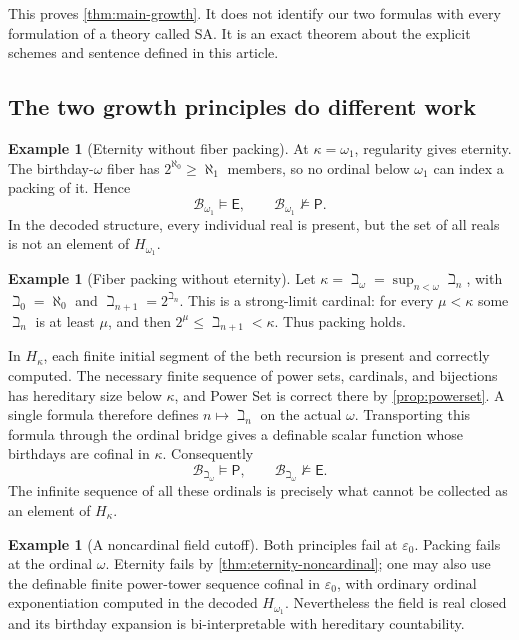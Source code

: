 \documentclass[11pt,letterpaper]{article}
\theoremstyle{definition}
\newtheorem{example}[theorem]{Example}
\theoremstyle{remark}
\newcommand{\B}{\mathcal B}
\newcommand{\Etern}{\mathsf E}
\newcommand{\Pack}{\mathsf P}
\begin{document}
This proves \cref{thm:main-growth}. It does not identify our two formulas with
every formulation of a theory called SA. It is an exact theorem about the
explicit schemes and sentence defined in this article.

\subsection{The two growth principles do different work}

\begin{example}[Eternity without fiber packing]
At $\kappa=\omega_1$, regularity gives eternity. The birthday-$\omega$ fiber
has $2^{\aleph_0}\ge\aleph_1$ members, so no ordinal below $\omega_1$ can
index a packing of it. Hence
\[
 \B_{\omega_1}\models\Etern,
 \qquad\B_{\omega_1}\not\models\Pack.
\]
In the decoded structure, every individual real is present, but the set of
all reals is not an element of $H_{\omega_1}$.
\end{example}

\begin{example}[Fiber packing without eternity]
\label{ex:bethomega}
Let $\kappa=\beth_\omega=\sup_{n<\omega}\beth_n$, with
$\beth_0=\aleph_0$ and $\beth_{n+1}=2^{\beth_n}$. This is a strong-limit
cardinal: for every $\mu<\kappa$ some $\beth_n$ is at least $\mu$, and then
$2^\mu\le\beth_{n+1}<\kappa$. Thus packing holds.

In $H_\kappa$, each finite initial segment of the beth recursion is present
and correctly computed. The necessary finite sequence of power sets,
cardinals, and bijections has hereditary size below $\kappa$, and Power Set
is correct there by \cref{prop:powerset}. A single formula therefore defines
$n\mapsto\beth_n$ on the actual $\omega$. Transporting this formula through
the ordinal bridge gives a definable scalar function whose birthdays are
cofinal in $\kappa$. Consequently
\[
 \B_{\beth_\omega}\models\Pack,
 \qquad\B_{\beth_\omega}\not\models\Etern.
\]
The infinite sequence of all these ordinals is precisely what cannot be
collected as an element of $H_\kappa$.
\end{example}

\begin{example}[A noncardinal field cutoff]
Both principles fail at $\varepsilon_0$. Packing fails at the ordinal
$\omega$. Eternity fails by \cref{thm:eternity-noncardinal}; one may also use
the definable finite power-tower sequence cofinal in $\varepsilon_0$,
with ordinary ordinal exponentiation computed in the decoded
$H_{\omega_1}$. Nevertheless the field is real closed and its birthday
expansion is bi-interpretable with hereditary countability.
\end{example}
\end{document}

